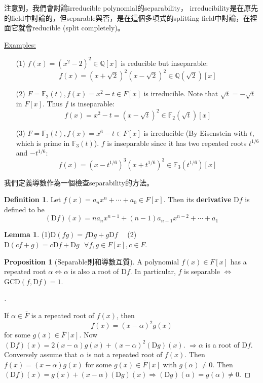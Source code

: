 \documentclass{article}
\newcommand{\sfa}{\text{  } \forall}
\theoremstyle{definition}
\newcommand{\ex}{\noindent\underline{Examples:}}
\newtheorem{lem}{Lemma}
\newtheorem{dfn}{Definition}
\newtheorem{prop}{Proposition}
\newenvironment{proofs}[1][\proofname]{%
  \begin{proof}[#1]$ $\par\nobreak\ignorespaces
}{%
  \end{proof}
}
\newcommand{\FF}{\mathbb F}
\newcommand{\QQ}{\mathbb Q}
\begin{document}
注意到，我們會討論irreducible polynomial的separability，
irreducibility是在原先的field中討論的，但separable與否，是在這個多項式的splitting field中討論，在裡面它就會reducible (split completely)。

\ex 

	\begin{enumerate}
		\item[(1)] $f(x) = (x^2 - 2)^2 \in \mathbb{Q}[x]$ is reducible but inseparable:
		\[f(x)=(x+\sqrt{2})^2(x-\sqrt{2})^2 \in \QQ(\sqrt2)[x]\]

		\item[(2)] $F = \mathbb{F}_2(t), f(x) = x^2 - t \in F[x]$ is irreducible.
			Note that $\sqrt{t} = -\sqrt{t}$ in $F[x]$. 
			Thus $f$ is inseparable:
			\[f(x)=x^2-t=(x-\sqrt{t})^2\in \FF_2(\sqrt{t})[x]\]
		\item[(3)] $F = \FF_3(t), f(x)=x^6-t\in F[x]$ is irreducible (By Eisenstein with $t$, which is prime in $\FF_3(t)$).
		$f$ is inseparable since it has two repeated roots $t^{1/6}$ and $-t^{1/6}$:
		\[f(x)=(x-t^{1/6})^3(x+t^{1/6})^3\in \FF_3(t^{1/6})[x]\]
	\end{enumerate}

我們定義導數作為一個檢查separability的方法。
\begin{dfn}
	Let $f(x) = a_n x^n + \cdots + a_0 \in F[x]$.
	Then its \textbf{derivative} $\mathrm{D} f$ is defined to be 
	\[
		(\mathrm{D} f)(x) = n a_nx^{n - 1} + (n - 1) a_{n - 1}x^{n - 2} + \cdots + a_1
	\]
\end{dfn}

\begin{lem}
	(1)$\mathrm{D}(fg) = f \mathrm{D} g + g \mathrm{D} f\quad$ (2) $\mathrm{D} (cf + g) = c \mathrm{D} f + \mathrm{D} g \sfa f, g \in F[x], c \in F$.
\end{lem}

\begin{prop}[Separable則和導數互質]
	A polynomial $f(x) \in F[x]$ has a repeated root $\alpha \Leftrightarrow \alpha$ is also a root of $\mathrm{D} f$.
	In particular, $f$ is separable $\Leftrightarrow$ $\text{GCD}(f, \mathrm{D} f) = 1$.
\end{prop}

\begin{proofs}
	If $\alpha \in \bar{F}$ is a repeated root of $f(x)$, then 
	\[
		f(x) = (x - \alpha)^2 g(x)
	\]
	for some $g(x) \in \bar{F}[x]$.
	Now $(\mathrm{D} f) (x) = 2(x - \alpha) g(x) + (x - \alpha)^2 (\mathrm{D} g)(x)$.
	$\Rightarrow \alpha$ is a root of $\mathrm{D} f$.
	Conversely assume that $\alpha$ is not a repeated root of $f(x)$. 
	Then $f(x) = (x - \alpha) g(x)$ for some $g(x) \in \bar{F}[x]$ with $g(\alpha) \neq 0$.
	Then $(\mathrm{D} f)(x) = g(x) + (x - \alpha) (\mathrm{D} g)(x) \Rightarrow (\mathrm{D} g)(\alpha) = g(\alpha) \neq 0$.
\end{proofs}
\end{document}
